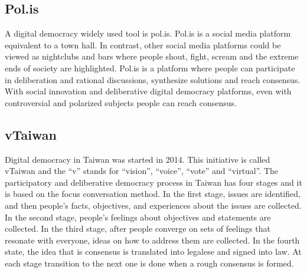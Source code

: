 \documentclass{IEEEtran}
\begin{document}



\subsection{Pol.is}
A digital democracy widely used tool is pol.is. Pol.is is a social media platform equivalent to a town hall. In contrast, other social media platforms could be viewed as nightclubs and bars where people shout, fight, scream and the extreme ends of society are highlighted. Pol.is is a platform where people can participate in deliberation and rational discussions, synthesize solutions and reach consensus.
With social innovation and deliberative digital democracy platforms, even with controversial and polarized subjects people can reach consensus.

\subsection{vTaiwan}
Digital democracy in Taiwan was started in 2014. This initiative is called vTaiwan and the “v” stands for “vision”, “voice”, “vote” and “virtual”. The participatory and deliberative democracy process in Taiwan has four stages and it is based on the focus conversation method. In the first stage, issues are identified, and then people’s facts, objectives, and experiences about the issues are collected. In the second stage, people's feelings about objectives and statements are collected. In the third stage, after people converge on sets of feelings that resonate with everyone, ideas on how to address them are collected. In the fourth state, the idea that is consensus is translated into legalese and signed into law. At each stage transition to the next one is done when a rough consensus is formed.
\end{document}
